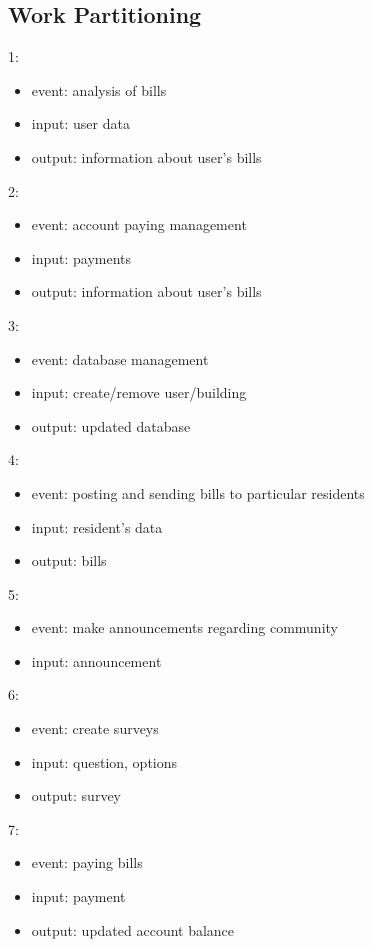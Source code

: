 \documentclass[a4paper,11pt,onecolumn,oneside]{book}
\begin{document}
\subsection{Work Partitioning}
1:
\begin{itemize}
\item event: analysis of bills
\item input: user data
\item output: information about user's bills
\end{itemize}
2:
\begin{itemize}
\item event: account paying management
\item input: payments
\item output: information about user's bills

\end{itemize}
3:
\begin{itemize}
\item event: database management
\item input: create/remove user/building
\item output: updated database 
 
\end{itemize}
4:
\begin{itemize}
\item event: posting and sending bills to particular residents
\item input: resident's data
\item output: bills
 
\end{itemize}
5:
\begin{itemize}
\item event: make announcements regarding community
\item input: announcement
\end{itemize}
6:
\begin{itemize}
\item event: create surveys
\item input: question, options
\item output: survey

\end{itemize}
7:
\begin{itemize}
\item event: paying bills
\item input: payment
\item output: updated account balance 
\end{itemize}
\end{document}
